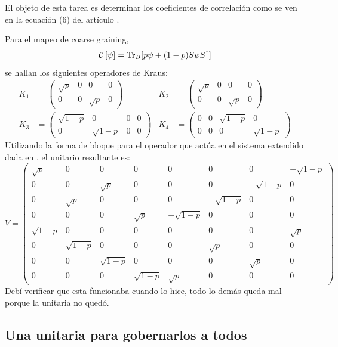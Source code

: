 El objeto de esta tarea es determinar los coeficientes de correlación como se ven en la ecuación (6) del artículo \cite{CGEmergingDynamics}.


Para el mapeo de coarse graining,
\begin{equation}
\mathcal{C}\left[\psi\right]=\Tr_{B}[p\psi+(1-p)S\psi S^{\dag}]
\end{equation}
se hallan los siguientes operadores de Kraus:
\begin{align}
    K_{1}&=\begin{pmatrix} \sqrt{p}&0&0&0\\0&0&\sqrt{p}&0\end{pmatrix} & K_{2}&=\begin{pmatrix} \sqrt{p}&0&0&0\\0&0&\sqrt{p}&0\end{pmatrix} \\ K_{3}&=\begin{pmatrix} \sqrt{1-p}&0&0&0\\0&\sqrt{1-p}&0&0\end{pmatrix} & K_{4}&=\begin{pmatrix} 0&0&\sqrt{1-p}&0\\0&0&0&\sqrt{1-p}\end{pmatrix}
\end{align}
Utilizando la forma de bloque para el operador que actúa en el sistema extendido dada en \cite{Chuang}, el unitario resultante es:
\begin{equation}
V=\begin{pmatrix}
\sqrt{p}&0&0&0&0&0&0&-\sqrt{1 - p}\\
0&0&\sqrt{p}&0&0&0&-\sqrt{1 - p}&0\\
0&\sqrt{p}&0&0&0&-\sqrt{1 - p}&0&0\\
0&0&0&\sqrt{p}&-\sqrt{1 - p}&0&0&0\\
\sqrt{1 - p}&0&0&0&0&0&0&\sqrt{p}\\
0&\sqrt{1 - p}&0&0&0&\sqrt{p}&0&0\\
0&0&\sqrt{1 - p}&0&0&0&\sqrt{p}&0\\
0&0&0&\sqrt{1 - p}&\sqrt{p}&0&0&0 
\end{pmatrix}
\end{equation}
Debí verificar que esta funcionaba cuando lo hice, todo lo demás queda mal porque la unitaria no quedó.

\subsection{Una unitaria para gobernarlos a todos}

